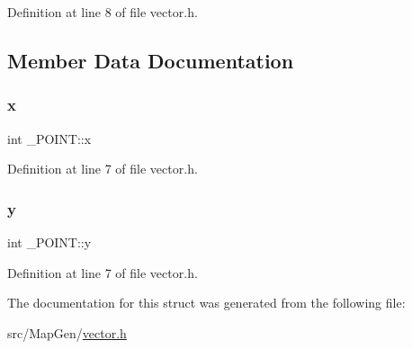 Definition at line 8 of file vector.\+h.



\subsection{Member Data Documentation}
\mbox{\label{struct___p_o_i_n_t_adb56f48b82c03caa0c994414658d0deb}} 
\subsubsection{\texorpdfstring{x}{x}}
{\footnotesize\ttfamily int \+\_\+\+P\+O\+I\+N\+T\+::x}



Definition at line 7 of file vector.\+h.

\mbox{\label{struct___p_o_i_n_t_a514d9f76b095fbddedd48a692ebb7041}} 
\subsubsection{\texorpdfstring{y}{y}}
{\footnotesize\ttfamily int \+\_\+\+P\+O\+I\+N\+T\+::y}



Definition at line 7 of file vector.\+h.



The documentation for this struct was generated from the following file\+:\begin{DoxyCompactItemize}
\item 
src/\+Map\+Gen/\mbox{\hyperlink{vector_8h}{vector.\+h}}\end{DoxyCompactItemize}
